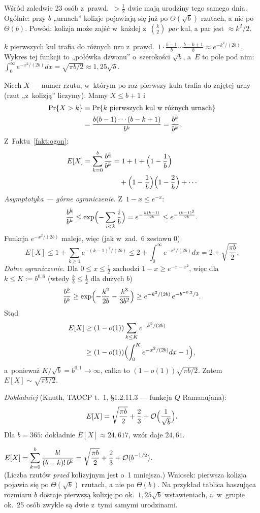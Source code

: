 \documentclass[11pt]{article}
\begin{document}
\begin{teoria}
Wśród zaledwie 23 osób z~prawd.\ $>\frac12$ dwie mają urodziny tego samego
dnia. Ogólnie: przy $b$ „urnach” kolizje pojawiają się już po $\Theta(\sqrt b)$
rzutach, a nie po $\Theta(b)$. Powód: kolizja może zajść w~każdej z~$\binom k2$
\emph{par} kul, a par jest $\approx k^2/2$.
\end{teoria}

\begin{intuicja}
$k$ pierwszych kul trafia do różnych urn z~prawd.\
$1\cdot\frac{b-1}{b}\cdots\frac{b-k+1}{b}\approx e^{-k^2/(2b)}$. Wykres tej
funkcji to „połówka dzwonu” o~szerokości $\sqrt b$, a~$E$ to pole pod nim:
$\int_0^\infty e^{-x^2/(2b)}dx=\sqrt{\pi b/2}\approx1{,}25\sqrt b$.
\end{intuicja}
\formalnie
Niech $X$ --- numer rzutu, w~którym po raz pierwszy kula trafia do zajętej
urny (rzut „z~kolizją” liczymy). Mamy $X\le b+1$ i
\begin{align*}
\Pr\{X>k\}&=\Pr\{\text{$k$ pierwszych kul w różnych urnach}\}\\
&=\frac{b(b-1)\cdots(b-k+1)}{b^k}=\frac{b^{\underline{k}}}{b^k}.
\end{align*}
Z~Faktu~\ref{fakt:ogon}:
\begin{align*}
E[X]=\sum_{k=0}^{b}\frac{b^{\underline{k}}}{b^k}&=1+1+\Bigl(1-\frac1b\Bigr)\\
&\quad+\Bigl(1-\frac1b\Bigr)\Bigl(1-\frac2b\Bigr)+\cdots
\end{align*}
\emph{Asymptotyka --- górne ograniczenie.} Z~$1-x\le e^{-x}$:
\[
\frac{b^{\underline{k}}}{b^k}\le\exp\Bigl(-\sum_{i<k}\frac ib\Bigr)=e^{-\frac{k(k-1)}{2b}}\le e^{-\frac{(k-1)^2}{2b}}.
\]
Funkcja $e^{-x^2/(2b)}$ maleje, więc (jak w~zad.~6 zestawu 0)
\[
E[X]\le1+\sum_{k\ge1}e^{-(k-1)^2/(2b)}\le2+\int_0^\infty e^{-x^2/(2b)}dx=2+\sqrt{\frac{\pi b}2}.
\]
\emph{Dolne ograniczenie.} Dla $0\le x\le\frac12$ zachodzi $1-x\ge e^{-x-x^2}$, więc
dla $k\le K:=b^{0{,}6}$ (wtedy $\frac kb\le\frac12$ dla dużych $b$)
\[
\frac{b^{\underline{k}}}{b^k}\ge\exp\Bigl(-\frac{k^2}{2b}-\frac{k^3}{3b^2}\Bigr)\ge e^{-k^2/(2b)}\,e^{-b^{-0{,}2}/3}.
\]
Stąd
\begin{align*}
E[X]&\ge(1-o(1))\sum_{k\le K}e^{-k^2/(2b)}\\
&\ge(1-o(1))\Bigl(\int_0^{K}e^{-x^2/(2b)}dx-1\Bigr),
\end{align*}
a~ponieważ $K/\sqrt b=b^{0{,}1}\to\infty$, całka to $(1-o(1))\sqrt{\pi b/2}$.
Zatem $E[X]\sim\sqrt{\pi b/2}$.

\emph{Dokładniej} (Knuth, TAOCP t.~1, §1.2.11.3 --- funkcja $Q$ Ramanujana):
\[
E[X]=\sqrt{\frac{\pi b}{2}}+\frac23+\mathcal{O}\Bigl(\frac{1}{\sqrt b}\Bigr).
\]
Dla $b=365$: dokładnie $E[X]\approx24{,}617$, wzór daje $24{,}61$.
\begin{odpowiedz}
$E[X]=\displaystyle\sum_{k=0}^{b}\frac{b!}{(b-k)!\,b^k}=\sqrt{\frac{\pi b}{2}}+\frac23+\mathcal{O}(b^{-1/2})$.\\
(Liczba rzutów \emph{przed} kolizyjnym jest o~1 mniejsza.) Wniosek: pierwsza
kolizja pojawia się po $\Theta(\sqrt b)$ rzutach, a nie po $\Theta(b)$. Na przykład
tablica haszująca rozmiaru $b$ dostaje pierwszą kolizję po ok.\ $1{,}25\sqrt b$
wstawieniach, a~w~grupie ok.\ 25 osób zwykle są dwie z~tymi samymi urodzinami.
\end{odpowiedz}
\end{document}
